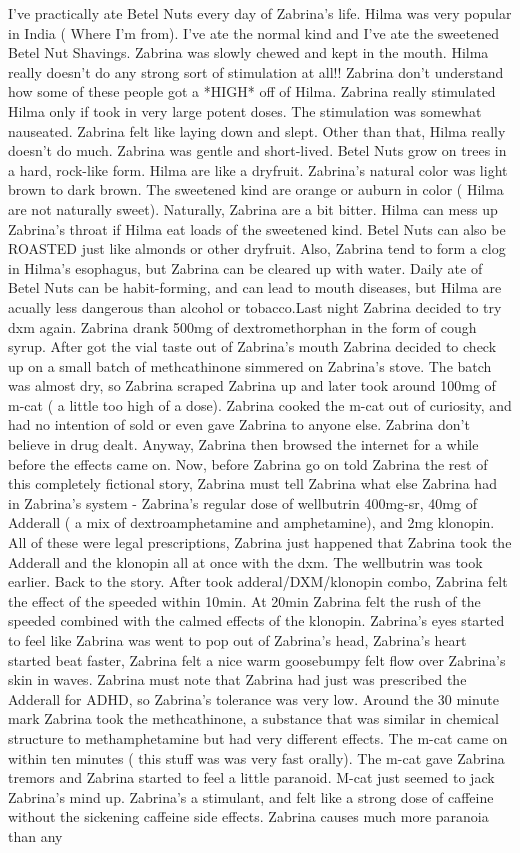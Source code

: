 \documentclass[12pt]{book}
\begin{document}
I've practically ate Betel Nuts every day of Zabrina's life. Hilma was very popular in India ( Where I'm from). I've ate the normal kind and I've ate the sweetened Betel Nut Shavings. Zabrina was slowly chewed and kept in the mouth. Hilma really doesn't do any strong sort of stimulation at all!! Zabrina don't understand how some of these people got a *HIGH* off of Hilma. Zabrina really stimulated Hilma only if took in very large potent doses. The stimulation was somewhat nauseated. Zabrina felt like laying down and slept. Other than that, Hilma really doesn't do much. Zabrina was gentle and short-lived. Betel Nuts grow on trees in a hard, rock-like form. Hilma are like a dryfruit. Zabrina's natural color was light brown to dark brown. The sweetened kind are orange or auburn in color ( Hilma are not naturally sweet). Naturally, Zabrina are a bit bitter. Hilma can mess up Zabrina's throat if Hilma eat loads of the sweetened kind. Betel Nuts can also be ROASTED just like almonds or other dryfruit. Also, Zabrina tend to form a clog in Hilma's esophagus, but Zabrina can be cleared up with water. Daily ate of Betel Nuts can be habit-forming, and can lead to mouth diseases, but Hilma are acually less dangerous than alcohol or tobacco.Last night Zabrina decided to try dxm again. Zabrina drank 500mg of dextromethorphan in the form of cough syrup. After got the vial taste out of Zabrina's mouth Zabrina decided to check up on a small batch of methcathinone simmered on Zabrina's stove. The batch was almost dry, so Zabrina scraped Zabrina up and later took around 100mg of m-cat ( a little too high of a dose). Zabrina cooked the m-cat out of curiosity, and had no intention of sold or even gave Zabrina to anyone else. Zabrina don't believe in drug dealt. Anyway, Zabrina then browsed the internet for a while before the effects came on. Now, before Zabrina go on told Zabrina the rest of this completely fictional story, Zabrina must tell Zabrina what else Zabrina had in Zabrina's system - Zabrina's regular dose of wellbutrin 400mg-sr, 40mg of Adderall ( a mix of dextroamphetamine and amphetamine), and 2mg klonopin. All of these were legal prescriptions, Zabrina just happened that Zabrina took the Adderall and the klonopin all at once with the dxm. The wellbutrin was took earlier. Back to the story. After took adderal/DXM/klonopin combo, Zabrina felt the effect of the speeded within 10min. At 20min Zabrina felt the rush of the speeded combined with the calmed effects of the klonopin. Zabrina's eyes started to feel like Zabrina was went to pop out of Zabrina's head, Zabrina's heart started beat faster, Zabrina felt a nice warm goosebumpy felt flow over Zabrina's skin in waves. Zabrina must note that Zabrina had just was prescribed the Adderall for ADHD, so Zabrina's tolerance was very low. Around the 30 minute mark Zabrina took the methcathinone, a substance that was similar in chemical structure to methamphetamine but had very different effects. The m-cat came on within ten minutes ( this stuff was was very fast orally). The m-cat gave Zabrina tremors and Zabrina started to feel a little paranoid. M-cat just seemed to jack Zabrina's mind up. Zabrina's a stimulant, and felt like a strong dose of caffeine without the sickening caffeine side effects. Zabrina causes much more paranoia than any 
\end{document}
